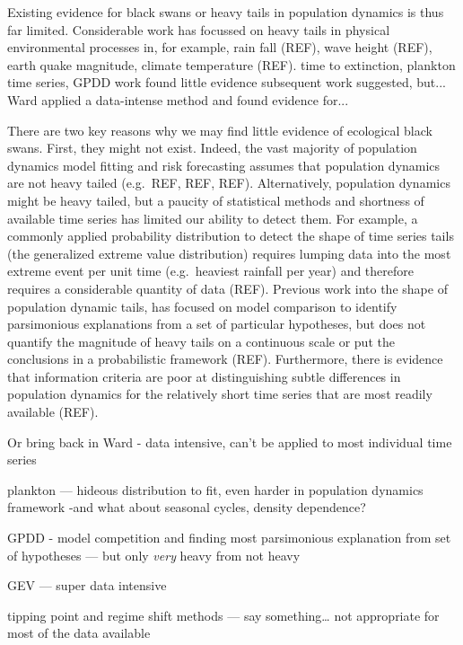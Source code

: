 Existing evidence for black swans or heavy tails in population dynamics is thus far limited. Considerable work has focussed on heavy tails in physical environmental processes in, for example, rain fall (REF), wave height (REF), earth quake magnitude, climate temperature (REF). time to extinction, plankton time series, GPDD work found little evidence
subsequent work suggested, but...
Ward applied a data-intense method and found evidence for...

There are two key reasons why we may find little evidence of ecological black swans. First, they might not exist. Indeed, the vast majority of population dynamics model fitting and risk forecasting assumes that population dynamics are not heavy tailed (e.g.~REF, REF, REF). Alternatively, population dynamics might be heavy tailed, but a paucity of statistical methods and shortness of available time series has limited our ability to detect them. For example, a commonly applied probability distribution to detect the shape of time series tails (the generalized extreme value distribution) requires lumping data into the most extreme event per unit time (e.g.~heaviest rainfall per year) and therefore requires a considerable quantity of data (REF). Previous work into the shape of population dynamic tails, has focused on model comparison to identify parsimonious explanations from a set of particular hypotheses, but does not quantify the magnitude of heavy tails on a continuous scale or put the conclusions in a probabilistic framework (REF). Furthermore, there is evidence that information criteria are poor at distinguishing subtle differences in population dynamics for the relatively short time series that are most readily available (REF).

Or bring back in Ward - data intensive, can't be applied to most individual time series

plankton --- hideous distribution to fit, even harder in population dynamics framework -and what about seasonal cycles, density dependence?

GPDD - model competition and finding most parsimonious explanation from set of hypotheses --- but only \emph{very} heavy from not heavy

GEV --- super data intensive

tipping point and regime shift methods --- say something\ldots{} not appropriate for most of the data available


